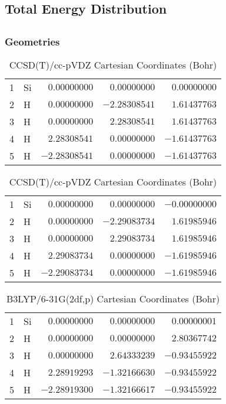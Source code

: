 \documentclass[10pt,oneside]{article}
\begin{document}
\begin{table}
\subsection*{Total Energy Distribution}
\centering\end{table}

\clearpage

\subsection{}

\begin{table}[h!]
\subsubsection*{Geometries}
\begin{multicols}{2}
\centering
\caption{CCSD(T)/cc-pVTZ Cartesian Coordinates (Bohr)}
\begin{tabular}{llrrr}
\toprule
1  & Si & $ 0.00000000$ & $ 0.00000000$ & $ 0.00000000$ \\
2  & H  & $ 0.00000000$ & $-2.28308541$ & $ 1.61437763$ \\
3  & H  & $ 0.00000000$ & $ 2.28308541$ & $ 1.61437763$ \\
4  & H  & $ 2.28308541$ & $ 0.00000000$ & $-1.61437763$ \\
5  & H  & $-2.28308541$ & $ 0.00000000$ & $-1.61437763$ \\
\bottomrule
\end{tabular}
\caption{CCSD(T)/cc-pVDZ Cartesian Coordinates (Bohr)}
\begin{tabular}{llrrr}
\toprule
1  & Si & $ 0.00000000$ & $ 0.00000000$ & $-0.00000000$ \\
2  & H  & $ 0.00000000$ & $-2.29083734$ & $ 1.61985946$ \\
3  & H  & $ 0.00000000$ & $ 2.29083734$ & $ 1.61985946$ \\
4  & H  & $ 2.29083734$ & $ 0.00000000$ & $-1.61985946$ \\
5  & H  & $-2.29083734$ & $ 0.00000000$ & $-1.61985946$ \\
\bottomrule
\end{tabular}
\end{multicols}
\end{table}

\begin{table}[h]
\centering
\caption{B3LYP/6-31G(2df,p) Cartesian Coordinates (Bohr)}
\begin{tabular}{llrrr}
\toprule
1  & Si & $ 0.00000000$ & $ 0.00000000$ & $ 0.00000001$ \\
2  & H  & $ 0.00000000$ & $ 0.00000000$ & $ 2.80367742$ \\
3  & H  & $ 0.00000000$ & $ 2.64333239$ & $-0.93455922$ \\
4  & H  & $ 2.28919293$ & $-1.32166630$ & $-0.93455922$ \\
5  & H  & $-2.28919300$ & $-1.32166617$ & $-0.93455922$ \\
\bottomrule
\end{tabular}
\end{table}
\end{document}
